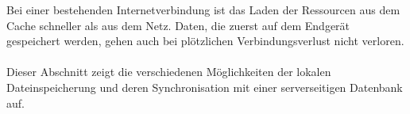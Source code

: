 Bei einer bestehenden Internetverbindung ist das Laden der Ressourcen aus dem Cache schneller als aus dem Netz. Daten, die zuerst auf dem Endgerät gespeichert werden, gehen auch bei plötzlichen Verbindungsverlust nicht verloren. \\\\
Dieser Abschnitt zeigt die verschiedenen Möglichkeiten der lokalen Dateinspeicherung und deren Synchronisation mit einer serverseitigen Datenbank auf.
%
%

%
%

%
%


%
%
